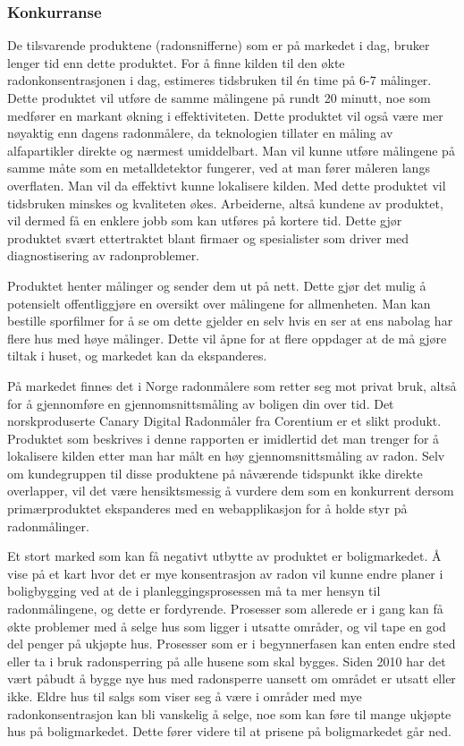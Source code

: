 \subsubsection{Konkurranse}

De tilsvarende produktene (radonsnifferne) som er på markedet i dag, bruker lenger tid enn dette produktet. For å finne kilden til den økte radonkonsentrasjonen i dag, estimeres tidsbruken til én time på 6-7 målinger. Dette produktet vil utføre de samme målingene på rundt 20 minutt, noe som medfører en markant økning i effektiviteten. Dette produktet vil også være mer nøyaktig enn dagens radonmålere, da teknologien tillater en måling av alfapartikler direkte og nærmest umiddelbart. Man vil kunne utføre målingene på samme måte som en metalldetektor fungerer, ved at man fører måleren langs overflaten. Man vil da effektivt kunne lokalisere kilden. Med dette produktet vil tidsbruken minskes og kvaliteten økes. Arbeiderne, altså kundene av produktet, vil dermed få en enklere jobb som kan utføres på kortere tid. Dette gjør produktet svært ettertraktet blant firmaer og spesialister som driver med diagnostisering av radonproblemer.

Produktet henter målinger og sender dem ut på nett. Dette gjør det mulig å potensielt offentliggjøre en oversikt over målingene for allmenheten. Man kan bestille sporfilmer for å se om dette gjelder en selv hvis en ser at ens nabolag har flere hus med høye målinger. Dette vil åpne for at flere oppdager at de må gjøre tiltak i huset, og markedet kan da ekspanderes.

På markedet finnes det i Norge radonmålere som retter seg mot privat bruk, altså for å gjennomføre en gjennomsnittsmåling av boligen din over tid. Det norskproduserte Canary Digital Radonmåler fra Corentium er et slikt produkt. Produktet som beskrives i denne rapporten er imidlertid det man trenger for å lokalisere kilden etter man har målt en høy gjennomsnittsmåling av radon. Selv om kundegruppen til disse produktene på nåværende tidspunkt ikke direkte overlapper, vil det være hensiktsmessig å vurdere dem som en konkurrent dersom primærproduktet ekspanderes med en webapplikasjon for å holde styr på radonmålinger.

Et stort marked som kan få negativt utbytte av produktet er boligmarkedet.
Å vise på et kart hvor det er mye konsentrasjon av radon vil kunne endre planer i boligbygging ved at de i planleggingsprosessen må ta mer hensyn til radonmålingene, og dette er fordyrende.
Prosesser som allerede er i gang kan få økte problemer med å selge hus som ligger i utsatte områder, og vil tape en god del penger på ukjøpte hus.
Prosesser som er i begynnerfasen kan enten endre sted eller ta i bruk radonsperring på alle husene som skal bygges. Siden 2010 har det vært påbudt å bygge nye hus med radonsperre uansett om området er utsatt eller ikke. Eldre hus til salgs som viser seg å være i områder med mye radonkonsentrasjon kan bli vanskelig å selge, noe som kan føre til mange ukjøpte hus på boligmarkedet. Dette fører videre til at prisene på boligmarkedet går ned.
